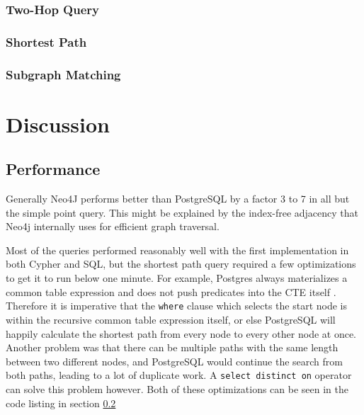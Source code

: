 \documentclass[11pt, a4paper,oneside,chapterprefix=false]{scrbook}
\begin{document}
\subsection{Two-Hop Query} \label{sec:result:two-hop}


\subsection{Shortest Path} \label{sec:result:shortest-path}


\subsection{Subgraph Matching} \label{sec:result:subgraph-matching}





\chapter{Discussion} \label{chp:discussion}

\section{Performance}

Generally Neo4J performs better than PostgreSQL by a factor 3 to 7 in all but the simple point query.
This might be explained by the index-free adjacency that Neo4j internally uses for efficient graph traversal.

Most of the queries performed reasonably well with the first implementation in both Cypher and SQL, but the shortest path query required a few optimizations to get it to run below one minute. For example, Postgres always materializes a common table expression and does not push predicates into the CTE itself \cite{postgresMaterialize}.
Therefore it is imperative that the \lstinline{where} clause which selects the start node is within the recursive common table expression itself, or else PostgreSQL will happily calculate the shortest path from every node to every other node at once.
Another problem was that there can be multiple paths with the same length between two different nodes, and PostgreSQL would continue the search from both paths, leading to a lot of duplicate work. A \lstinline{select distinct on} operator can solve this problem however.
Both of these optimizations can be seen in the code listing in section \ref{sec:result:shortest-path}
\end{document}
